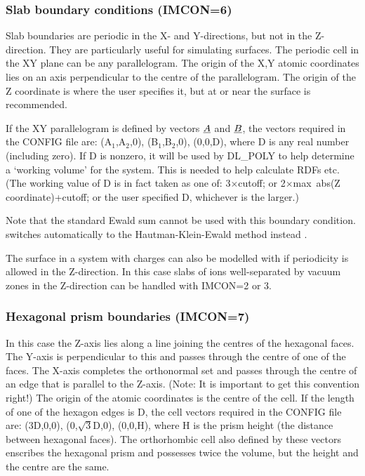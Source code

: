 \subsubsection*{Slab boundary conditions (IMCON=6)}

Slab boundaries are periodic in the X- and Y-directions, but not in
the Z-direction. They are particularly useful for simulating surfaces.
The periodic cell in the XY plane can be any parallelogram. The origin
of the X,Y atomic coordinates lies on an axis perpendicular to the
centre of the parallelogram. The origin of the Z coordinate is where
the user specifies it, but at or near the surface is recommended.

If the XY parallelogram is defined by vectors $\mbox{$\underline{A}$}$ and $\mbox{$\underline{B}$}$,
the vectors required in the CONFIG file are: (A$_{1}$,A$_{2}$,0),
(B$_{1}$,B$_{2}$,0), (0,0,D), where D is any real number (including
zero). If D is nonzero, it will be used by DL\_POLY to help determine
a `working volume' for the system. This is needed to help calculate
RDFs etc. (The working value of D is in fact taken as one of:
3$\times$cutoff; or 2$\times$max~abs(Z coordinate)+cutoff; or the user
specified D, whichever is the larger.)

Note that the standard Ewald sum cannot be used with this boundary
condition. \D{} switches automatically to the Hautman-Klein-Ewald method
instead \cite{hautman-92a}.  

The surface in a system with charges can also be modelled with \D{} if
periodicity is allowed in the Z-direction. In this case slabs of
ions well-separated by vacuum zones in the Z-direction can be handled
with IMCON=2 or 3.

\subsubsection*{Hexagonal prism boundaries (IMCON=7)}

In this case the Z-axis lies along a line joining the centres of the
hexagonal faces. The Y-axis is perpendicular to this and passes
through the centre of one of the faces. The X-axis completes the
orthonormal set and passes through the centre of an edge that is
parallel to the Z-axis. (Note: It is important to get this convention
right!) The origin of the atomic coordinates is the centre of the
cell. If the length of one of the hexagon edges is D, the cell vectors
required in the CONFIG file are: (3D,0,0), (0,$\sqrt{3}$D,0), (0,0,H),
where H is the prism height (the distance between hexagonal
faces). The orthorhombic cell also defined by these vectors enscribes the
hexagonal prism and possesses twice the volume, but the height
and the centre are the same. 


